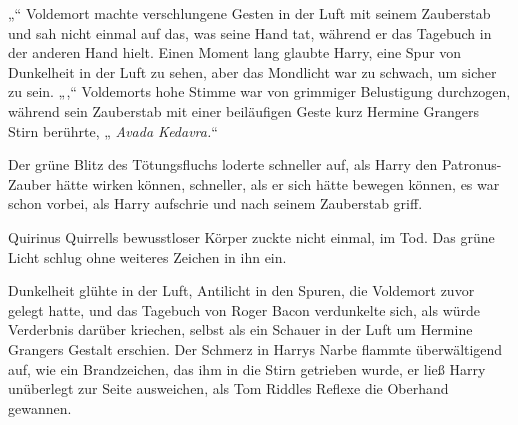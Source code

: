 „“
Voldemort machte verschlungene Gesten in der Luft mit seinem Zauberstab und sah nicht einmal auf das, was seine Hand tat, während er das Tagebuch in der anderen Hand hielt. Einen Moment lang glaubte Harry, eine Spur von Dunkelheit in der Luft zu sehen, aber das Mondlicht war zu schwach, um sicher zu sein.
„,“ Voldemorts hohe Stimme war von grimmiger Belustigung durchzogen, während sein Zauberstab mit einer beiläufigen Geste kurz Hermine Grangers Stirn berührte, „ \emph{Avada Kedavra.}“

Der grüne Blitz des Tötungsfluchs loderte schneller auf, als Harry den Patronus-Zauber hätte wirken können, schneller, als er sich hätte bewegen können, es war schon vorbei, als Harry aufschrie und nach seinem Zauberstab griff.

Quirinus Quirrells bewusstloser Körper zuckte nicht einmal, im Tod. Das grüne Licht schlug ohne weiteres Zeichen in ihn ein.

Dunkelheit glühte in der Luft, Antilicht in den Spuren, die Voldemort zuvor gelegt hatte, und das Tagebuch von Roger Bacon verdunkelte sich, als würde Verderbnis darüber kriechen, selbst als ein Schauer in der Luft um Hermine Grangers Gestalt erschien.
Der Schmerz in Harrys Narbe flammte überwältigend auf, wie ein Brandzeichen, das ihm in die Stirn getrieben wurde, er ließ Harry unüberlegt zur Seite ausweichen, als Tom Riddles Reflexe die Oberhand gewannen.

